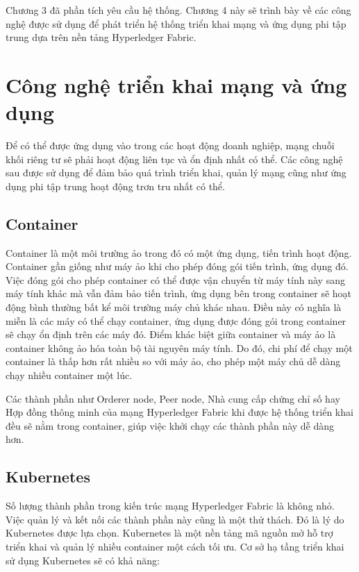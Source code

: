 \documentclass[../DoAn.tex]{subfiles}
\begin{document}
Chương 3 đã phần tích yêu cầu hệ thống. Chương 4 này sẽ trình bày về các công
nghệ được sử dụng để phát triển hệ thống triển khai mạng và ứng dụng
phi tập trung dựa trên nền tảng Hyperledger Fabric.

\section{Công nghệ triển khai mạng và ứng dụng}

Để có thể được ứng dụng vào trong các hoạt động doanh nghiệp, mạng chuỗi khối riêng tư sẽ phải hoạt động liên tục và ổn định nhất có thể. Các công nghệ sau được sử dụng để đảm bảo quá trình triển khai, quản lý mạng cũng như ứng dụng phi tập trung hoạt động trơn tru nhất có thể.

\subsection{Container}
Container là một môi trường ảo trong đó có một ứng dụng, tiến trình hoạt động.
Container gần giống như máy ảo khi cho phép đóng gói tiến trình, ứng dụng đó.
Việc đóng gói cho phép container có thể được vận chuyển từ máy tính này sang
máy tính khác mà vẫn đảm bảo tiến trình, ứng dụng bên trong container sẽ hoạt
động bình thường bất kể môi trường máy chủ khác nhau. Điều này có nghĩa là miễn
là các máy có thể chạy container, ứng dụng được đóng gói trong container sẽ
chạy ổn định trên các máy đó. Điểm khác biệt giữa container và máy ảo là
container không ảo hóa toàn bộ tài nguyên máy tính. Do đó, chi phí để chạy một
container là thấp hơn rất nhiều so với máy ảo, cho phép một máy chủ dễ dàng
chạy nhiều container một lúc.

Các thành phần như Orderer node, Peer node, Nhà cung cấp chứng chỉ số hay Hợp
đồng thông minh của mạng Hyperledger Fabric khi được hệ thống triển khai đều sẽ
nằm trong container, giúp việc khởi chạy các thành phần này dễ dàng hơn.

\subsection{Kubernetes}
Số lượng thành phần trong kiến trúc mạng Hyperledger Fabric là không nhỏ. Việc
quản lý và kết nối các thành phần này cũng là một thử thách. Đó là lý do
Kubernetes\cite{kubernetes} được lựa chọn. Kubernetes là một nền tảng mã nguồn mở hỗ trợ triển
khai và quản lý nhiều container một cách tối ưu. Cơ sở hạ tầng triển khai sử
dụng Kubernetes sẽ có khả năng:
\end{document}
